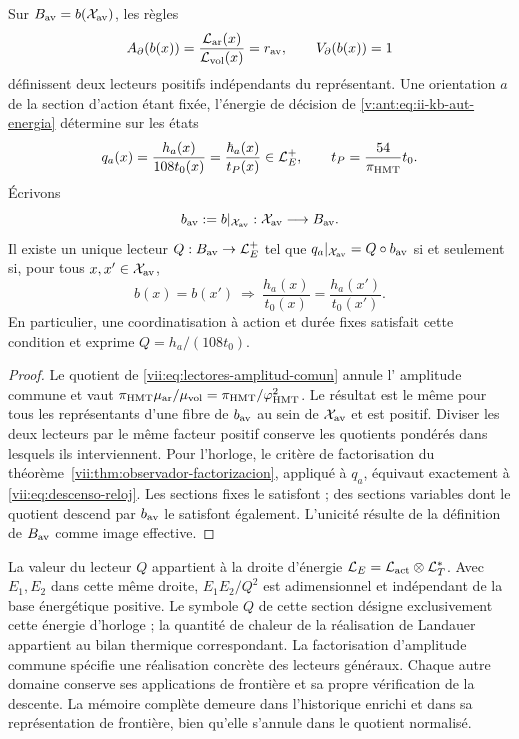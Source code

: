 \begin{proposition}
\label{vii:prop:lectores-frontera-explicitos}
Sur \(B_{\rm av}=b(\mathcal X_{\rm av})\), les règles
\begin{equation}
 A_\partial(b(x))
 =\frac{\mathcal L_{\rm ar}(x)}{\mathcal L_{\rm vol}(x)}
 =r_{\rm av},\qquad V_\partial(b(x))=1
 \label{vii:eq:lectores-normalizados}
\end{equation}
définissent deux lecteurs positifs indépendants du représentant.
Une orientation \(a\) de la section d'action étant fixée, l'énergie de
décision de \eqref{v:ant:eq:ii-kb-aut-energia} détermine sur les états
\begin{equation}
 q_a(x)=\frac{h_a(x)}{108t_0(x)}
       =\frac{\hbar_a(x)}{t_P(x)}\in\mathcal L_E^+,
 \qquad t_P=\frac{54}{\pi_{\rm HMT}}t_0.
 \label{vii:eq:lector-q-accion}
\end{equation}
Écrivons
\[
 b_{\rm av}:=b|_{\mathcal X_{\rm av}}:
 \mathcal X_{\rm av}\longrightarrow B_{\rm av}.
\]
Il existe un unique lecteur \(Q:B_{\rm av}\to\mathcal L_E^+\) tel que
\(q_a|_{\mathcal X_{\rm av}}=Q\circ b_{\rm av}\)
si et seulement si, pour tous \(x,x'\in\mathcal X_{\rm av}\),
\begin{equation}
 b(x)=b(x')\ \Longrightarrow\
 \frac{h_a(x)}{t_0(x)}=\frac{h_a(x')}{t_0(x')}.
 \label{vii:eq:descenso-reloj}
\end{equation}
En particulier, une coordinatisation à action et durée fixes satisfait cette condition et exprime \(Q=h_a/(108t_0)\).
\end{proposition}
\begin{proof}
Le quotient de \eqref{vii:eq:lectores-amplitud-comun} annule l'
amplitude commune et vaut
\(\pi_{\rm HMT}\mu_{\rm ar}/\mu_{\rm vol}
=\pi_{\rm HMT}/\varphi_{\rm HMT}^2\).
Le résultat est le même pour tous les représentants d'une fibre
de \(b_{\rm av}\) au sein de \(\mathcal X_{\rm av}\) et est positif.
Diviser les deux lecteurs par le même facteur positif
conserve les quotients pondérés dans lesquels ils interviennent.
Pour l'horloge, le critère de factorisation du
théorème~\ref{vii:thm:observador-factorizacion}, appliqué à \(q_a\),
équivaut exactement à \eqref{vii:eq:descenso-reloj}. Les sections
fixes le satisfont ; des sections variables dont le
quotient descend par \(b_{\rm av}\) le satisfont également. L'unicité résulte de la définition
de \(B_{\rm av}\) comme image effective.
\end{proof}

La valeur du lecteur \(Q\) appartient à la droite d'énergie \(\mathcal L_E=\mathcal L_{\rm act}\otimes\mathcal L_T^*\). Avec \(E_1,E_2\) dans cette même droite, \(E_1E_2/Q^2\) est adimensionnel et indépendant de la base énergétique positive. Le symbole \(Q\) de cette section désigne exclusivement cette énergie d'horloge ; la quantité de chaleur de la réalisation de Landauer appartient au bilan thermique correspondant. La factorisation d'amplitude commune spécifie une réalisation concrète des lecteurs généraux. Chaque autre domaine conserve ses applications de frontière et sa propre vérification de la descente. La mémoire complète demeure dans l'historique enrichi et dans sa représentation de frontière, bien qu'elle s'annule dans le quotient normalisé.



